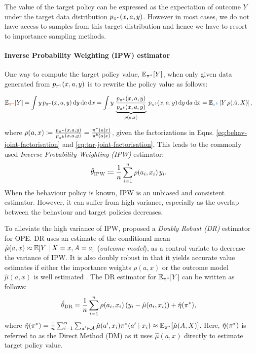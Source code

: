 The value of the target policy can be expressed as the expectation of outcome $Y$ under the target data distribution $p_{\pi^*}(x, a, y)$.
However in most cases, we do not have access to samples from this target distribution and hence we have to resort to importance sampling methods.
\paragraph{Inverse Probability Weighting (IPW) estimator}
One way to compute the target policy value, $\mathbb{E}_{\pi^*}[Y]$, when only given data generated from $p_{\pi^b}(x, a, y)$ is to rewrite the policy value as follows:

\begin{small}
\begin{align*}
    \Etarred[Y] =
    \int y \, \ptar(x, a, y) \,\mathrm{d}y \, \mathrm{d}a\, \mathrm{d}x   =
    \int y \, \underbrace{\frac{\ptar(x, a, y)}{\pbeh(x, a, y)}}_{\rho(a,x)}\, \pbeh(x, a, y) \,\mathrm{d}y \, \mathrm{d}a\, \mathrm{d}x =
    \Ebehblue\left[Y\,\rho(A, X)\right],
\end{align*}
\end{small} 
where 
$
\rho(a, x) \coloneqq \frac{p_{\pi^*}(x, a, y)}{p_{\pi^b}(x, a, y)} = \frac{\pi^*(a|x)}{\pi^b(a|x)}
$, given the factorizations in Eqns. \eqref{eq:behav-joint-factorisation} and \eqref{eq:tar-joint-factorisation}.
This leads to the commonly used \emph{Inverse Probability Weighting (IPW)} \citep{horvitz1952generalization} estimator:
\[
\hat{\theta}_{\textup{IPW}} \coloneqq \frac{1}{n}\sum_{i=1}^n \rho(a_i, x_i)\,y_i.
\]
When the behaviour policy is known, IPW is an unbiased and consistent estimator. However, it can suffer from high variance, especially as the overlap between the behaviour and target policies decreases. 

To alleviate the high variance of IPW, \cite{dudik2014doubly} proposed a \emph{Doubly Robust (DR)} estimator for OPE. 
DR uses an estimate of the conditional mean $\hat{\mu}(a, x) \approx\mathbb{E}[Y\mid X=x, A=a]$ (\emph{outcome model}), as a control variate to decrease the variance of IPW. It is also doubly robust in that it yields accurate value estimates if either the importance weights $\rho(a, x)$ or the outcome model $\hat{\mu}(a, x)$ is well estimated \citep{dudik2014doubly, jiang2016doubly}. 
The DR estimator for $\mathbb{E}_{\pi^*}[Y]$ can be written as follows:
\[
\hat{\theta}_{\textup{DR}} = \frac{1}{n} \sum_{i=1}^n \rho(a_i, x_i)\,(y_i - \hat{\mu}(a_i, x_i)) + \hat{\eta}(\pi^*),
\]
where
$
\hat{\eta}(\pi^*) = \frac{1}{n} \sum_{i=1}^n \sum_{a'\in \mathcal{A}} \hat{\mu}(a', x_i) \pi^*(a'\mid x_i) \approx \mathbb{E}_{\pi^*}[\hat{\mu}(A, X)]$. Here, $\hat{\eta}(\pi^*)$ is referred to as the Direct Method (DM) as it uses $\hat{\mu}(a, x)$ directly to estimate target policy value. 


